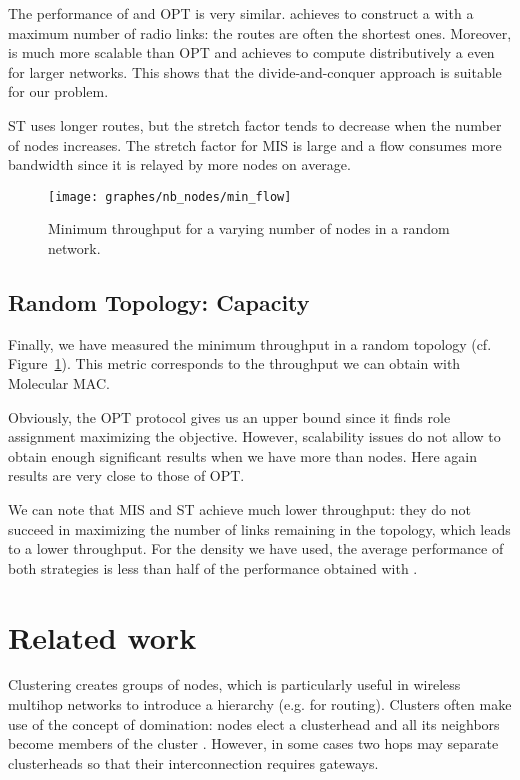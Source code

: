 \documentclass[twoside]{article}
\begin{document}
The performance of \potatoes and OPT is very similar. \potatoes
achieves to construct a \rwcds with a maximum number of radio links:
the routes are often the shortest ones. Moreover, \potatoes is much
more scalable than OPT and achieves to compute distributively a \rwcds
even for larger networks. This shows that the divide-and-conquer approach
is suitable for our problem.

ST uses longer routes, but the stretch factor tends to decrease when
the number of nodes increases. The stretch factor for MIS is large and
a flow consumes more bandwidth since it is relayed by more nodes on
average.

\begin{figure}[!h]
\centering
	\texttt{[image: graphes/nb\_nodes/min\_flow]}        
	\caption{Minimum throughput  for a varying number
          of nodes in a random network.} 
\label{fig:nb_nodes-min_flow}
\end{figure}


\subsection{Random Topology:  Capacity}

Finally, we have measured the minimum throughput  in a random
topology (cf. Figure~\ref{fig:nb_nodes-min_flow}). This metric
corresponds to the throughput we can obtain with Molecular MAC.

Obviously, the OPT protocol gives us an upper bound since it finds
role assignment maximizing the objective. However, scalability issues
do not allow to obtain enough significant results when we have more
than  nodes. Here again \potatoes results are very close to those
of OPT.

We can note that MIS and ST achieve much lower throughput: they do not
succeed in maximizing the number of links remaining in the \rwcds
topology, which leads to a lower throughput.  For the density we have used,
the average performance of both strategies is less than half of the
performance obtained with \potatoes.








\section{Related work}
\label{section:related_work}

Clustering creates groups of nodes, which is particularly useful in
wireless multihop networks to introduce a hierarchy (e.g. for
routing). Clusters often make use of the concept of domination: nodes
elect a clusterhead and all its neighbors become members of the
cluster \cite{lin97}. However, in some cases two hops may separate
clusterheads so that their interconnection requires gateways.
\end{document}
